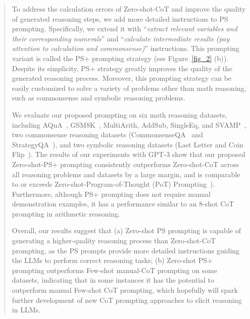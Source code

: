 \documentclass[11pt]{article}
\begin{document}
\begin{abstract}
To address the calculation errors of Zero-shot-CoT and improve the quality of generated reasoning steps, we add more detailed instructions to PS prompting. Specifically, we extend it with ``\textit{extract relevant variables and their corresponding numerals}'' and ``\textit{calculate intermediate results (pay attention to calculation and commonsense)}'' instructions. This prompting variant is called the PS+ prompting strategy (see Figure~\ref{fig_2} (b)).
Despite its simplicity, PS+ strategy greatly improves the quality of the generated reasoning process. 
Moreover, this prompting strategy can be easily customized to solve a variety of problems other than math reasoning, such as commonsense and symbolic reasoning problems.

We evaluate our proposed prompting on six math reasoning datasets, including AQuA~\cite{aqua}, GSM8K~\cite{gsm8k}, MultiArith, AddSub, SingleEq, and SVAMP~\cite{svamp}, two commonsense reasoning datasets (CommonsenseQA~\cite{commonsenseqa} and StrategyQA~\cite{strategyqa}), and two symbolic reasoning datasets (Last Letter and Coin Flip~\cite{cot_wei}).
The results of our experiments with GPT-3 show that our proposed Zero-shot-PS+ prompting consistently outperforms Zero-shot-CoT across all reasoning problems and datasets by a large margin, and is comparable to or exceeds Zero-shot-Program-of-Thought (PoT) Prompting~\cite{chen2022program}).
Furthermore, although PS+ prompting does not require manual demonstration examples, it has a performance similar to an 8-shot CoT prompting in arithmetic reasoning.

Overall, our results suggest that (a) Zero-shot PS prompting is capable of generating a higher-quality reasoning process than Zero-shot-CoT prompting, as the PS prompts provide more detailed instructions guiding the LLMs to perform correct reasoning tasks;
(b) Zero-shot PS+ prompting outperforms Few-shot manual-CoT prompting on some datasets, indicating that in some instances it has the potential to outperform manual Few-shot CoT prompting, which hopefully will spark further development of new CoT prompting approaches to elicit reasoning in LLMs.





\end{abstract}
\end{document}

